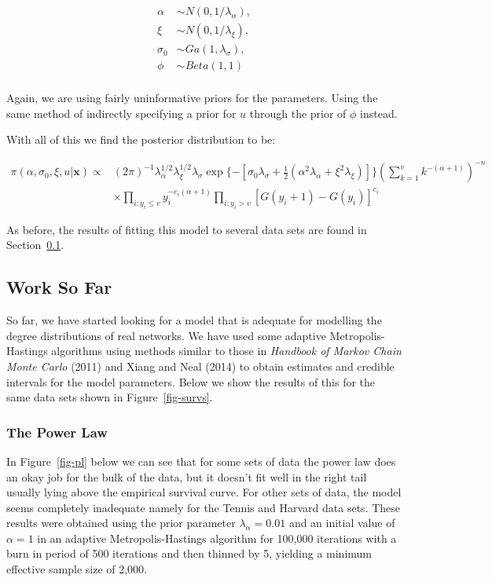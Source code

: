 \documentclass[
]{article}
\begin{document}
\begin{align*}
\alpha &\sim N(0,1/\lambda_\alpha),\\
\xi &\sim N(0,1/\lambda_\xi),\\
\sigma_0 &\sim Ga(1,\lambda_\sigma),\\
\phi &\sim Beta(1,1)\\
%
\end{align*}

Again, we are using fairly uninformative priors for the parameters.
Using the same method of indirectly specifying a prior for \(u\) through
the prior of \(\phi\) instead.

With all of this we find the posterior distribution to be:

\begin{align*}
\pi(\alpha,\sigma_0, \xi, u| \boldsymbol{x}) \propto & (2\pi)^{-1}\lambda_\alpha^{1/2}\lambda_\xi^{1/2}\lambda_\sigma\exp\{-[\sigma_0\lambda_\sigma + \frac{1}{2}(\alpha^2\lambda_\alpha + \xi^2\lambda_\xi)]\} \left(\sum_{k=1}^v k^{-(\alpha+1)}\right)^{-n}\\& \times \prod_{i:y_i\le v}y_i^{-c_i(\alpha+1)}\prod_{i:y_i>v}\left[G(y_i+1) - G(y_i)\right]^{c_i}
\end{align*}

As before, the results of fitting this model to several data sets are
found in Section~\ref{sec-wsf}.

\hypertarget{sec-wsf}{%
\subsection{Work So Far}\label{sec-wsf}}

So far, we have started looking for a model that is adequate for
modelling the degree distributions of real networks. We have used some
adaptive Metropolis-Hastings algorithms using methods similar to those
in \emph{Handbook of Markov Chain Monte Carlo} (2011) and Xiang and Neal
(2014) to obtain estimates and credible intervals for the model
parameters. Below we show the results of this for the same data sets
shown in Figure~\ref{fig-survs}.

\hypertarget{the-power-law}{%
\subsubsection{The Power Law}\label{the-power-law}}

In Figure~\ref{fig-pl} below we can see that for some sets of data the
power law does an okay job for the bulk of the data, but it doesn't fit
well in the right tail usually lying above the empirical survival curve.
For other sets of data, the model seems completely inadequate namely for
the Tennis and Harvard data sets. These results were obtained using the
prior parameter \(\lambda_\alpha = 0.01\) and an initial value of
\(\alpha=1\) in an adaptive Metropolis-Hastings algorithm for 100,000
iterations with a burn in period of 500 iterations and then thinned by
5, yielding a minimum effective sample size of 2,000.
\end{document}
